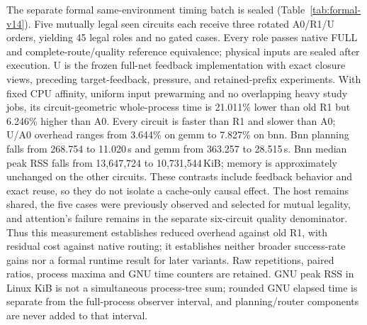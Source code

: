 \documentclass[conference,10pt]{IEEEtran}
\begin{document}
The separate formal same-environment timing batch is sealed (Table~\ref{tab:formal-v14}). Five mutually legal seen circuits each receive three rotated A0/R1/U orders, yielding 45 legal roles and no gated cases. Every role passes native FULL and complete-route/quality reference equivalence; physical inputs are sealed after execution. U is the frozen full-net feedback implementation with exact closure views, preceding target-feedback, pressure, and retained-prefix experiments. With fixed CPU affinity, uniform input prewarming and no overlapping heavy study jobs, its circuit-geometric whole-process time is 21.011\% lower than old R1 but 6.246\% higher than A0. Every circuit is faster than R1 and slower than A0; U/A0 overhead ranges from 3.644\% on gemm to 7.827\% on bnn. Bnn planning falls from 268.754 to 11.020\,s and gemm from 363.257 to 28.515\,s. Bnn median peak RSS falls from 13,647,724 to 10,731,544\,KiB; memory is approximately unchanged on the other circuits. These contrasts include feedback behavior and exact reuse, so they do not isolate a cache-only causal effect. The host remains shared, the five cases were previously observed and selected for mutual legality, and attention's failure remains in the separate six-circuit quality denominator. Thus this measurement establishes reduced overhead against old R1, with residual cost against native routing; it establishes neither broader success-rate gains nor a formal runtime result for later variants. Raw repetitions, paired ratios, process maxima and GNU time counters are retained. GNU peak RSS in Linux KiB is not a simultaneous process-tree sum; rounded GNU elapsed time is separate from the full-process observer interval, and planning/router components are never added to that interval.

\end{document}
